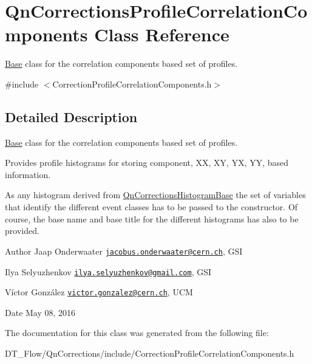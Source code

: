 \hypertarget{classQnCorrectionsProfileCorrelationComponents}{}\section{Qn\+Corrections\+Profile\+Correlation\+Components Class Reference}
\label{classQnCorrectionsProfileCorrelationComponents}


\mbox{\hyperlink{classBase}{Base}} class for the correlation components based set of profiles.  




{\ttfamily \#include $<$Correction\+Profile\+Correlation\+Components.\+h$>$}



\subsection{Detailed Description}
\mbox{\hyperlink{classBase}{Base}} class for the correlation components based set of profiles. 

Provides profile histograms for storing component, XX, XY, YX, YY, based information.

As any histogram derived from \mbox{\hyperlink{classQnCorrectionsHistogramBase}{Qn\+Corrections\+Histogram\+Base}} the set of variables that identify the different event classes has to be passed to the constructor. Of course, the base name and base title for the different histograms has also to be provided.

\begin{DoxyAuthor}{Author}
Jaap Onderwaater \href{mailto:jacobus.onderwaater@cern.ch}{\tt jacobus.\+onderwaater@cern.\+ch}, G\+SI 

Ilya Selyuzhenkov \href{mailto:ilya.selyuzhenkov@gmail.com}{\tt ilya.\+selyuzhenkov@gmail.\+com}, G\+SI 

Víctor González \href{mailto:victor.gonzalez@cern.ch}{\tt victor.\+gonzalez@cern.\+ch}, U\+CM 
\end{DoxyAuthor}
\begin{DoxyDate}{Date}
May 08, 2016 
\end{DoxyDate}


The documentation for this class was generated from the following file\+:\begin{DoxyCompactItemize}
\item 
D\+T\+\_\+\+Flow/\+Qn\+Corrections/include/Correction\+Profile\+Correlation\+Components.\+h\end{DoxyCompactItemize}

